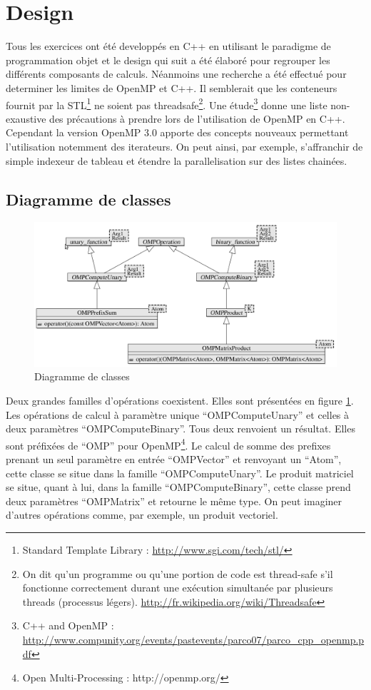 \section{Design}

Tous les exercices ont été developpés en C++ en utilisant le paradigme de programmation objet et le design qui suit a été élaboré pour regrouper les différents composants de calculs. Néanmoins une recherche a été effectué pour determiner les limites de OpenMP et C++. Il semblerait que les conteneurs fournit par la STL\footnote{Standard Template Library : \url{http://www.sgi.com/tech/stl/}} ne soient pas threadsafe\footnote{On dit qu’un programme ou qu'une portion de code est thread-safe s'il fonctionne correctement durant une exécution simultanée par plusieurs threads (processus légers). \url{http://fr.wikipedia.org/wiki/Threadsafe}}. Une étude\footnote{C++ and OpenMP : \url{http://www.compunity.org/events/pastevents/parco07/parco_cpp_openmp.pdf}} donne une liste non-exaustive des précautions à prendre lors de l’utilisation de OpenMP en C++. Cependant la version OpenMP 3.0 apporte des concepts nouveaux permettant l’utilisation notemment des iterateurs. On peut ainsi, par exemple, s’affranchir de simple indexeur de tableau et étendre la parallelisation sur des listes chainées.

\subsection{Diagramme de classes}

\begin{figure}[here]
\centering
\includegraphics[scale=0.45]{diagram}
\caption{Diagramme de classes}
\label{fig:diagram}
\end{figure}

Deux grandes familles d'opérations coexistent. Elles sont présentées en figure \ref{fig:diagram}. Les opérations de calcul à paramètre unique ``OMPComputeUnary'' et celles à deux paramètres ``OMPComputeBinary''. Tous deux renvoient un résultat. Elles sont préfixées de ``OMP'' pour OpenMP\footnote{Open Multi-Processing : http://openmp.org/}. Le calcul de somme des prefixes prenant un seul paramètre en entrée ``OMPVector'' et renvoyant un ``Atom'', cette classe se situe dans la famille ``OMPComputeUnary''. Le produit matriciel se situe, quant à lui, dans la famille “OMPComputeBinary”, cette classe prend deux paramètres ``OMPMatrix'' et retourne le même type. On peut imaginer d'autres opérations comme, par exemple, un produit vectoriel.

